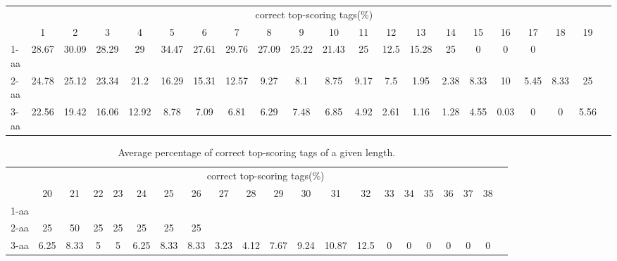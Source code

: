 \documentclass{article}[12pt]
\begin{document}
\begin{landscape}

\begin{table}[h]\tiny
\vspace{3mm}
{\centering
\begin{center}
\begin{tabular}{|l|c|c|c|c|c|c|c|c|c|c|c|c|c|c|c|c|c|c|c|c|}
  \hline
  & \multicolumn{ 19 }{|c|}{correct top-scoring tags(\%)} \\
  \cline{2- 20}
    & 1 & 2 & 3 & 4 & 5 & 6 & 7 & 8 & 9 & 10 & 11 & 12 & 13 & 14 & 15 & 16 & 17 & 18 & 19\\
  \hline
1-aa  & 28.67 & 30.09 & 28.29 & 29 & 34.47 & 27.61 & 29.76 & 27.09 & 25.22 & 21.43 & 25 & 12.5 & 15.28 & 25 & 0 & 0 & 0 &  & \\
2-aa  & 24.78 & 25.12 & 23.34 & 21.2 & 16.29 & 15.31 & 12.57 & 9.27 & 8.1 & 8.75 & 9.17 & 7.5 & 1.95 & 2.38 & 8.33 & 10 & 5.45 & 8.33 & 25\\
3-aa  & 22.56 & 19.42 & 16.06 & 12.92 & 8.78 & 7.09 & 6.81 & 6.29 & 7.48 & 6.85 & 4.92 & 2.61 & 1.16 & 1.28 & 4.55 & 0.03 & 0 & 0 & 5.56\\
 \hline
\end{tabular}
\end{center}
\par}
\centering

\vspace{3mm}
\end{table}
\begin{table}[h]\tiny
\vspace{3mm}
{\centering
\begin{center}
\begin{tabular}{|l|c|c|c|c|c|c|c|c|c|c|c|c|c|c|c|c|c|c|c|c|}
  \hline
  & \multicolumn{ 19 }{|c|}{correct top-scoring tags(\%)} \\
  \cline{2- 20}
    & 20 & 21 & 22 & 23 & 24 & 25 & 26 & 27 & 28 & 29 & 30 & 31 & 32 & 33 & 34 & 35 & 36 & 37 & 38\\
  \hline
1-aa  &  &  &  &  &  &  &  &  &  &  &  &  &  &  &  &  &  &  & \\
2-aa  & 25 & 50 & 25 & 25 & 25 & 25 & 25 &  &  &  &  &  &  &  &  &  &  &  & \\
3-aa  & 6.25 & 8.33 & 5 & 5 & 6.25 & 8.33 & 8.33 & 3.23 & 4.12 & 7.67 & 9.24 & 10.87 & 12.5 & 0 & 0 & 0 & 0 & 0 & 0\\
 \hline
\end{tabular}
\end{center}
\par}
\centering

\caption{ Average percentage of correct top-scoring tags of a given length.}
\label{table:avg-top-scoring}

\vspace{3mm}
\end{table}
\end{landscape}
\end{document}
